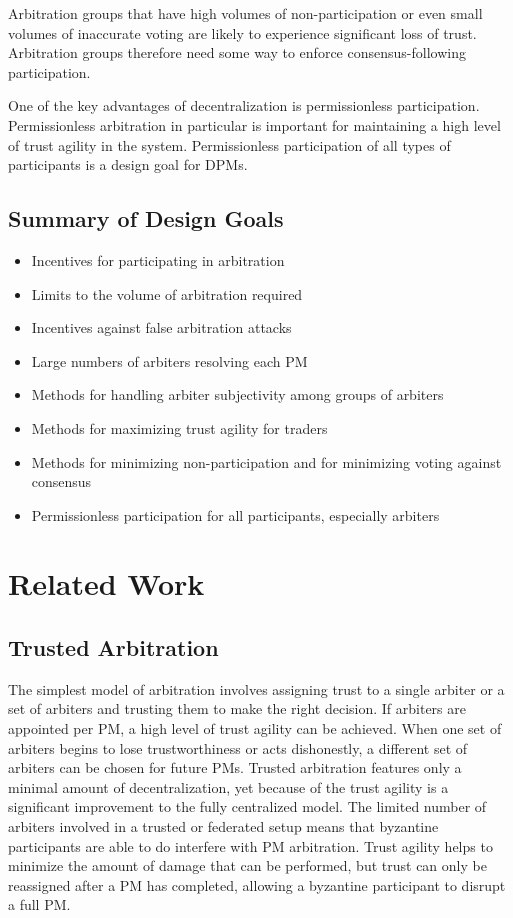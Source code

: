 \documentclass[onecolumn]{article}
\begin{document}
Arbitration groups that have high volumes of non-participation or even small volumes of inaccurate voting are likely to experience significant loss of trust.
Arbitration groups therefore need some way to enforce consensus-following participation.

One of the key advantages of decentralization is permissionless participation.
Permissionless arbitration in particular is important for maintaining a high level of trust agility in the system.
Permissionless participation of all types of participants is a design goal for DPMs.

\subsection*{Summary of Design Goals}
\begin{itemize}
	\item Incentives for participating in arbitration
	\item Limits to the volume of arbitration required
	\item Incentives against false arbitration attacks
	\item Large numbers of arbiters resolving each PM
	\item Methods for handling arbiter subjectivity among groups of arbiters
	\item Methods for maximizing trust agility for traders
	\item Methods for minimizing non-participation and for minimizing voting against consensus
	\item Permissionless participation for all participants, especially arbiters
\end{itemize}

\section{Related Work}

\subsection{Trusted Arbitration}
The simplest model of arbitration involves assigning trust to a single arbiter or a set of arbiters and trusting them to make the right decision.
If arbiters are appointed per PM, a high level of trust agility can be achieved.
When one set of arbiters begins to lose trustworthiness or acts dishonestly, a different set of arbiters can be chosen for future PMs.
Trusted arbitration features only a minimal amount of decentralization, yet because of the trust agility is a significant improvement to the fully centralized model.
The limited number of arbiters involved in a trusted or federated setup means that byzantine participants are able to do interfere with PM arbitration.
Trust agility helps to minimize the amount of damage that can be performed, but trust can only be reassigned after a PM has completed, allowing a byzantine participant to disrupt a full PM.
\end{document}
